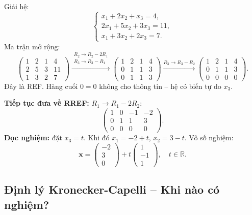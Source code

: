 \documentclass[12pt,a4paper]{article}
\begin{document}
\begin{vidu}[title={Khử Gauss đầy đủ -- 3 ẩn, 3 phương trình}]
Giải hệ:
\[
  \begin{cases} x_1 + 2x_2 + x_3 = 4, \\ 2x_1 + 5x_2 + 3x_3 = 11, \\ x_1 + 3x_2 + 2x_3 = 7. \end{cases}
\]
Ma trận mở rộng:
\[
  \left(\begin{array}{ccc|c}
    1 & 2 & 1 & 4 \\
    2 & 5 & 3 & 11 \\
    1 & 3 & 2 & 7
  \end{array}\right)
  \xrightarrow{\substack{R_2 \to R_2 - 2R_1 \\ R_3 \to R_3 - R_1}}
  \left(\begin{array}{ccc|c}
    1 & 2 & 1 & 4 \\
    0 & 1 & 1 & 3 \\
    0 & 1 & 1 & 3
  \end{array}\right)
  \xrightarrow{R_3 \to R_3 - R_2}
  \left(\begin{array}{ccc|c}
    1 & 2 & 1 & 4 \\
    0 & 1 & 1 & 3 \\
    0 & 0 & 0 & 0
  \end{array}\right).
\]
Đây là REF. Hàng cuối $0 = 0$ không cho thông tin -- hệ có biến tự do $x_3$.

\textbf{Tiếp tục đưa về RREF:} $R_1 \to R_1 - 2R_2$:
\[
  \left(\begin{array}{ccc|c}
    1 & 0 & -1 & -2 \\
    0 & 1 & 1 & 3 \\
    0 & 0 & 0 & 0
  \end{array}\right).
\]
\textbf{Đọc nghiệm:} đặt $x_3 = t$. Khi đó $x_1 = -2 + t$, $x_2 = 3 - t$. Vô số nghiệm:
\[
  \mathbf{x} = \begin{pmatrix}-2\\3\\0\end{pmatrix} + t\begin{pmatrix}1\\-1\\1\end{pmatrix},\quad t \in \mathbb{R}.
\]
\end{vidu}

\subsection{Định lý Kronecker-Capelli -- Khi nào có nghiệm?}
\end{document}
